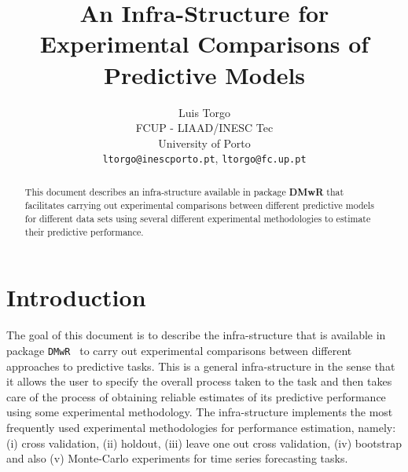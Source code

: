 \documentclass[10pt,a4paper]{article}\usepackage[]{graphicx}\usepackage[]{color}
\author{Luis Torgo\\FCUP - LIAAD/INESC Tec\\University of Porto\\
  \texttt{ltorgo@inescporto.pt}, \texttt{ltorgo@fc.up.pt}}
\title{An Infra-Structure for\\ Experimental Comparisons of Predictive Models}
\newcommand{\DR}{package \texttt{DMwR}}
\begin{document}
\maketitle

\begin{abstract}
  This document describes an infra-structure available in package
  \textbf{DMwR} that facilitates carrying out experimental comparisons
  between different predictive models for different data sets using
  several different experimental methodologies to estimate their
  predictive performance.
\end{abstract}

\section{Introduction}

The goal of this document is to describe the infra-structure that is
available in \DR~\cite{Tor10} to carry out experimental comparisons
between different approaches to predictive tasks. This is a general
infra-structure in the sense that it allows the user to specify the
overall process taken to the task and then takes care of the process
of obtaining reliable estimates of its predictive performance
using  some experimental methodology. The infra-structure
implements the most frequently used experimental methodologies for
performance estimation, namely: (i) cross validation, (ii) holdout,
(iii) leave one out cross validation, (iv) bootstrap and also (v)
Monte-Carlo experiments for time series forecasting tasks.
\end{document}
